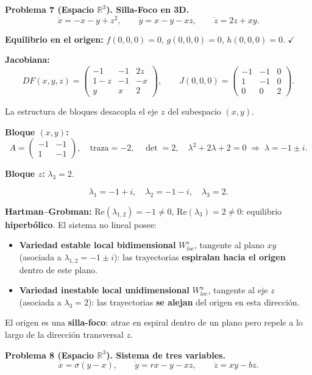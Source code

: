 \documentclass[12pt,letterpaper]{article}
\begin{document}
\bigskip
\noindent\textbf{Problema 7 (Espacio $\mathbb{R}^3$). Silla-Foco en 3D.}
\[
  \dot x = -x-y+z^2, \qquad \dot y = x-y-xz, \qquad \dot z = 2z+xy.
\]

\textbf{Equilibrio en el origen:} $f(0,0,0)=0$, $g(0,0,0)=0$, $h(0,0,0)=0$. $\checkmark$

\textbf{Jacobiana:}
\[
  DF(x,y,z)=\begin{pmatrix}-1&-1&2z\\1-z&-1&-x\\y&x&2\end{pmatrix},
  \qquad
  J(0,0,0)=\begin{pmatrix}-1&-1&0\\1&-1&0\\0&0&2\end{pmatrix}.
\]

La estructura de bloques desacopla el eje $z$ del subespacio $(x,y)$.

\textbf{Bloque $(x,y)$:}
\[
  A=\begin{pmatrix}-1&-1\\1&-1\end{pmatrix},\quad
  \text{traza}=-2,\quad \det=2,\quad
  \lambda^2+2\lambda+2=0 \;\Rightarrow\; \lambda=-1\pm i.
\]

\textbf{Bloque $z$:} $\lambda_3=2$.

\[
  \boxed{\lambda_1=-1+i,\quad \lambda_2=-1-i,\quad \lambda_3=2.}
\]

\textbf{Hartman--Grobman:} $\text{Re}(\lambda_{1,2})=-1\neq0$, $\text{Re}(\lambda_3)=2\neq0$:
equilibrio \textbf{hiperbólico}. El sistema no lineal posee:
\begin{itemize}
  \item \textbf{Variedad estable local bidimensional} $W^s_{loc}$, tangente al plano $xy$
    (asociada a $\lambda_{1,2}=-1\pm i$): las trayectorias \textbf{espiralan hacia el origen}
    dentro de este plano.
  \item \textbf{Variedad inestable local unidimensional} $W^u_{loc}$, tangente al eje $z$
    (asociada a $\lambda_3=2$): las trayectorias \textbf{se alejan} del origen en esta dirección.
\end{itemize}
El origen es una \textbf{silla-foco}: atrae en espiral dentro de un plano pero repele a lo largo
de la dirección transversal $z$.

\bigskip
\noindent\textbf{Problema 8 (Espacio $\mathbb{R}^3$). Sistema de tres variables.}
\[
  \dot x = \sigma(y-x), \qquad \dot y = rx-y-xz, \qquad \dot z = xy-bz.
\]
\end{document}

